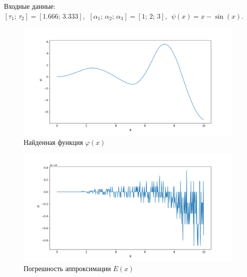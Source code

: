 \documentclass{article}
\theoremstyle{definition}
\begin{document}
\newpage	

Входные данные: \\
$[\tau_1;\, \tau_2] = [1.666;\, 3.333]$, $\;[\alpha_1;\, \alpha_2;\, \alpha_3] = [1;\, 2;\, 3]$,
$\;\psi(x) = x - \sin(x)$.
\begin{figure}[H]
	\centering
	\includegraphics[trim={2.3cm, 0, 0, 1.5cm}, clip, scale=0.62]{10_u0.png}
	\caption{Найденная функция $\varphi(x)$}
	\label{fig:image13}
\end{figure}

\begin{figure}[H]
	\centering
	\includegraphics[trim={2.2cm, 0, 0, 1.5cm}, clip, scale=0.617]{10_E.png}
	\caption{Погрешность аппроксимации $E(x)$}
	\label{fig:image14}
\end{figure}

\newpage
\end{document}
